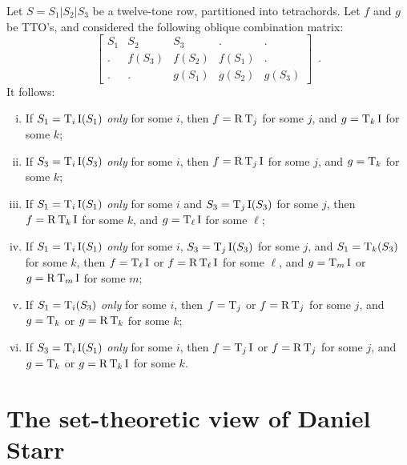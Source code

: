 \begin{example}
	\cite[241]{Martino1961}
	\label{ex:oblique}
	Let $S = S_1 | S_2 | S_3$ be a twelve-tone row, partitioned into tetrachords. Let $f$ and $g$ be TTO's, and considered the following oblique combination matrix:
	\begin{equation}
    	\left[
    	\begin{array}{c|c|c|c|c}
        	S_1 & S_2 & S_3 & . & . \\
        	. & f(S_3) & f(S_2) & f(S_1) & . \\
        	. & . & g(S_1) & g(S_2) & g(S_3)
    	\end{array}
    	\right] \enspace.
	\end{equation}
	It follows:
	\begin{enumerate}[i.]
		\item If $S_1 = \operatorname{T}_i\operatorname{I}(S_1)$ \emph{only} for some $i$, then $f = \operatorname{R}\operatorname{T}_j$ for some $j$, and $g = \operatorname{T}_k\operatorname{I}$ for some $k$;
		\item If $S_3 = \operatorname{T}_i\operatorname{I}(S_3)$ \emph{only} for some $i$, then $f = \operatorname{R}\operatorname{T}_j\operatorname{I}$ for some $j$, and $g = \operatorname{T}_k$ for some $k$;
		\item If $S_1 = \operatorname{T}_i\operatorname{I}(S_1)$ \emph{only} for some $i$ and $S_3 = \operatorname{T}_j\operatorname{I}(S_3)$ for some $j$, then $f = \operatorname{R}\operatorname{T}_k\operatorname{I}$ for some $k$, and $g = \operatorname{T}_\ell\operatorname{I}$ for some $\ell$;
		\item If $S_1 = \operatorname{T}_i\operatorname{I}(S_1)$ \emph{only} for some $i$, $S_3 = \operatorname{T}_j\operatorname{I}(S_3)$ for some $j$, and $S_1 = \operatorname{T}_k(S_3)$ for some $k$, then $f = \operatorname{T}_\ell\operatorname{I}$ or $f = \operatorname{R}\operatorname{T}_\ell\operatorname{I}$ for some $\ell$, and $g = \operatorname{T}_m\operatorname{I}$ or $g = \operatorname{R}\operatorname{T}_m\operatorname{I}$ for some $m$;
		\item If $S_1 = \operatorname{T}_i(S_3)$ \emph{only} for some $i$, then $f = \operatorname{T}_j$ or $f = \operatorname{R}\operatorname{T}_j$ for some $j$, and $g = \operatorname{T}_k$ or $g = \operatorname{R}\operatorname{T}_k$ for some $k$;
		\item If $S_3 = \operatorname{T}_i\operatorname{I}(S_1)$ \emph{only} for some $i$, then $f = \operatorname{T}_j\operatorname{I}$ or $f = \operatorname{R}\operatorname{T}_j$ for some $j$, and $g = \operatorname{T}_k$ or $g = \operatorname{R}\operatorname{T}_k\operatorname{I}$ for some $k$.
	\end{enumerate}
\end{example}


\section{The set-theoretic view of Daniel Starr}


